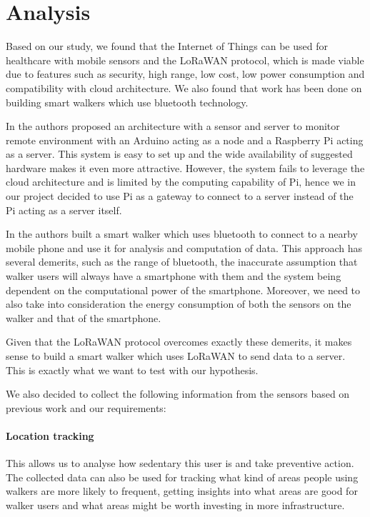 \chapter{Analysis}
\label{cha:analysis}

Based on our study, we found that the Internet of Things can be used for healthcare with mobile sensors and the LoRaWAN protocol, which is made viable due to features such as security, high range, low cost, low power consumption and compatibility with cloud architecture. We also found that work has been done on building smart walkers which use bluetooth technology.

In \cite{erdoush2014wireless} the authors proposed an architecture with a sensor and server to monitor remote environment with an Arduino acting as a node and a Raspberry Pi acting as a server. This system is easy to set up and the wide availability of suggested hardware makes it even more attractive. However, the system fails to leverage the cloud architecture and is limited by the computing capability of Pi, hence we in our project decided to use Pi as a gateway to connect to a server instead of the Pi acting as a server itself.


In \cite{postolache2011smart} the authors built a smart walker which uses bluetooth to connect to a nearby mobile phone and use it for analysis and computation of data. This approach has several demerits, such as the range of bluetooth, the inaccurate assumption that walker users will always have a smartphone with them and the system being dependent on the computational power of the smartphone. Moreover, we need to also take into consideration the energy consumption of both the sensors on the walker and that of the smartphone.

Given that the LoRaWAN protocol overcomes exactly these demerits, it makes sense to build a smart walker which uses LoRaWAN to send data to a server.
This is exactly what we want to test with our hypothesis.

We also decided to collect the following information from the sensors based on previous work \cite{postolache2011smart} and our requirements: 

\subsubsection{Location tracking}
This allows us to analyse how sedentary this user is and take preventive action. The collected data can also be used for tracking what kind of areas people using walkers are more likely to frequent, getting insights into what areas are good for walker users and what areas might be worth investing in more infrastructure.

